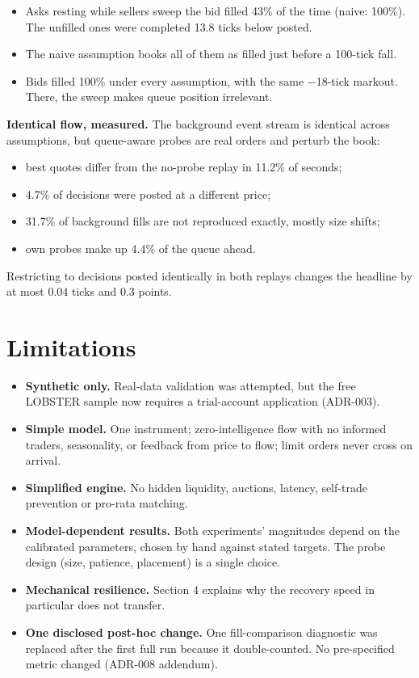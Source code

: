 \documentclass[11pt]{article}
\providecommand{\tightlist}{\setlength{\itemsep}{0pt}\setlength{\parskip}{0pt}}
\begin{document}
\begin{itemize}
\tightlist
\item
  Asks resting while sellers sweep the bid filled 43\% of the time
  (naive: 100\%). The unfilled ones were completed 13.8 ticks below
  posted.
\item
  The naive assumption books all of them as filled just before a
  100-tick fall.
\item
  Bids filled 100\% under every assumption, with the same −18-tick
  markout. There, the sweep makes queue position irrelevant.
\end{itemize}

\textbf{Identical flow, measured.} The background event stream is identical
across assumptions, but queue-aware probes are real orders and perturb
the book:

\begin{itemize}
\tightlist
\item
  best quotes differ from the no-probe replay in 11.2\% of seconds;
\item
  4.7\% of decisions were posted at a different price;
\item
  31.7\% of background fills are not reproduced exactly, mostly size
  shifts;
\item
  own probes make up 4.4\% of the queue ahead.
\end{itemize}

Restricting to decisions posted identically in both replays changes the
headline by at most 0.04 ticks and 0.3 points.

\hypertarget{limitations}{%
\section{Limitations}\label{limitations}}

\begin{itemize}
\tightlist
\item
  \textbf{Synthetic only.} Real-data validation was attempted, but the free
  LOBSTER sample now requires a trial-account application (ADR-003).
\item
  \textbf{Simple model.} One instrument; zero-intelligence flow with no
  informed traders, seasonality, or feedback from price to flow; limit
  orders never cross on arrival.
\item
  \textbf{Simplified engine.} No hidden liquidity, auctions, latency,
  self-trade prevention or pro-rata matching.
\item
  \textbf{Model-dependent results.} Both experiments' magnitudes depend on
  the calibrated parameters, chosen by hand against stated targets. The
  probe design (size, patience, placement) is a single choice.
\item
  \textbf{Mechanical resilience.} Section 4 explains why the recovery speed
  in particular does not transfer.
\item
  \textbf{One disclosed post-hoc change.} One fill-comparison diagnostic was
  replaced after the first full run because it double-counted. No
  pre-specified metric changed (ADR-008 addendum).
\end{itemize}
\end{document}
